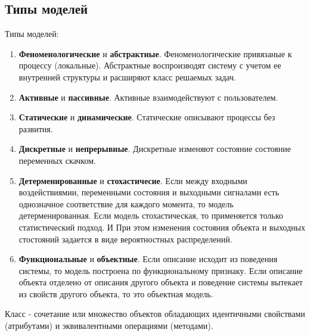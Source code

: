 \subsection{Типы моделей}
Типы моделей:
\begin{enumerate}
  \item \textbf{Феноменологические} и \textbf{абстрактные}. Феноменологические
    привязаные к процессу (локальные). Абстрактные воспроизводят систему с
    учетом ее  внутренней структуры и расширяют класс решаемых задач.
  \item \textbf{Активные} и \textbf{пассивные}. Активные взаимодействуют с 
    пользователем.
  \item \textbf{Статические} и \textbf{динамические}. Статические описывают 
    процессы без развития.
  \item \textbf{Дискретные} и \textbf{непрерывные}. Дискретные изменяют 
    состояние состояние  переменных скачком.
  \item \textbf{Детерменированные} и \textbf{стохастичесие}. Если между входными
    воздействиямии, переменными состояния и выходными сигналами есть однозначное 
    соответствие  для каждого момента, то модель детерменированная. Если модель
    стохастическая, то применяется только статистический подход. И При этом
    изменения состояния объекта и выходных стостояний задается в виде
    вероятностных распределений.
  \item \textbf{Функциональные} и \textbf{объектные}. Если описание исходит из
    поведения системы, то модель построена по функциональному признаку. Если 
    описание объекта отделено от описания другого объекта и поведение системы
    вытекает из свойств другого объекта, то это объектная модель.
\end{enumerate}
{\ttfamily Класс - сочетание или множество объектов обладающих идентичными
свойствами (атрибутами) и эквивалентными операциями (методами).}
